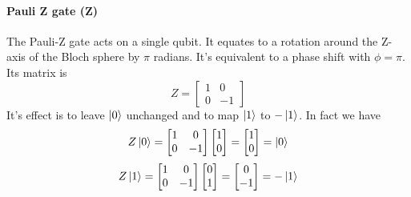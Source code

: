 \documentclass[main.tex]{subfiles}
\theoremstyle{definition}
\begin{document}
	\paragraph{Pauli Z gate (Z)} The Pauli-Z gate acts on a single qubit. It equates to a rotation around the Z-axis of the Bloch sphere by $\pi$ radians. It's equivalent to 
	a phase shift with $\phi=\pi$.
	Its matrix is
	\begin{equation}
	Z=
	\begin{bmatrix}
	1 & 0\\
	0 & -1
	\end{bmatrix}
	\end{equation}
	It's effect is to leave $\ket{0}$ unchanged and to map $\ket{1}$ to $-\ket{1}$. In fact we have
	$$
	Z\ket{0}=
	\begin{bmatrix}
	1 & 0\\
	0 & -1
	\end{bmatrix}
	\begin{bmatrix}
	1 \\
	0
	\end{bmatrix}
	=
	\begin{bmatrix}
	1 \\
	0
	\end{bmatrix}
	=
	\ket{0}
	$$
	$$
	Z\ket{1}=
	\begin{bmatrix}
	1 & 0\\
	0 & -1
	\end{bmatrix}
	\begin{bmatrix}
	0 \\
	1
	\end{bmatrix}
	=
	\begin{bmatrix}
	0 \\
	-1
	\end{bmatrix}
	=
	-\ket{1}
	$$	
	
\end{document}
